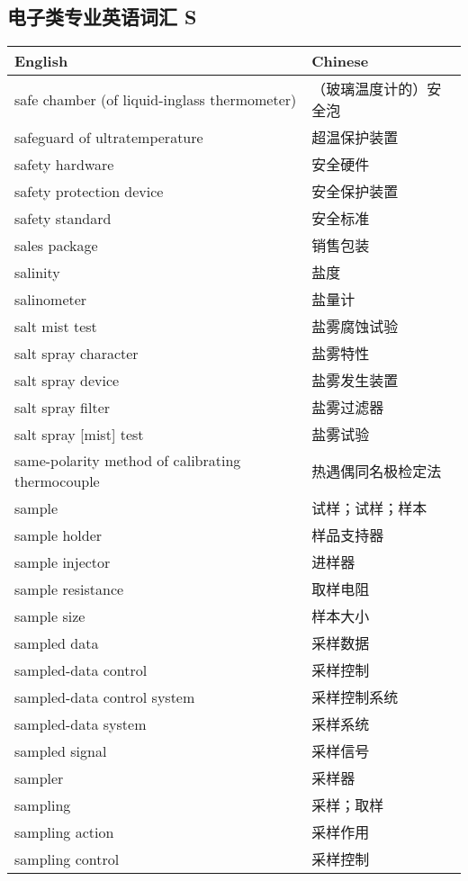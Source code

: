 \documentclass[
]{article}
\begin{document}
\hypertarget{ux7535ux5b50ux7c7bux4e13ux4e1aux82f1ux8bedux8bcdux6c47-s}{%
\subsection{\texorpdfstring{电子类专业英语词汇 S
}{电子类专业英语词汇 S }}\label{ux7535ux5b50ux7c7bux4e13ux4e1aux82f1ux8bedux8bcdux6c47-s}}

\begin{longtable}[]{@{}ll@{}}
\toprule()
English & Chinese \\
\midrule()
\endhead
safe chamber (of liquid-inglass thermometer) & （玻璃温度计的）安全泡 \\
safeguard of ultratemperature & 超温保护装置 \\
safety hardware & 安全硬件 \\
safety protection device & 安全保护装置 \\
safety standard & 安全标准 \\
sales package & 销售包装 \\
salinity & 盐度 \\
salinometer & 盐量计 \\
salt mist test & 盐雾腐蚀试验 \\
salt spray character & 盐雾特性 \\
salt spray device & 盐雾发生装置 \\
salt spray filter & 盐雾过滤器 \\
salt spray {[}mist{]} test & 盐雾试验 \\
same-polarity method of calibrating thermocouple & 热遇偶同名极检定法 \\
sample & 试样；试样；样本 \\
sample holder & 样品支持器 \\
sample injector & 进样器 \\
sample resistance & 取样电阻 \\
sample size & 样本大小 \\
sampled data & 采样数据 \\
sampled-data control & 采样控制 \\
sampled-data control system & 采样控制系统 \\
sampled-data system & 采样系统 \\
sampled signal & 采样信号 \\
sampler & 采样器 \\
sampling & 采样；取样 \\
sampling action & 采样作用 \\
sampling control & 采样控制 \\

\end{longtable}
\end{document}
